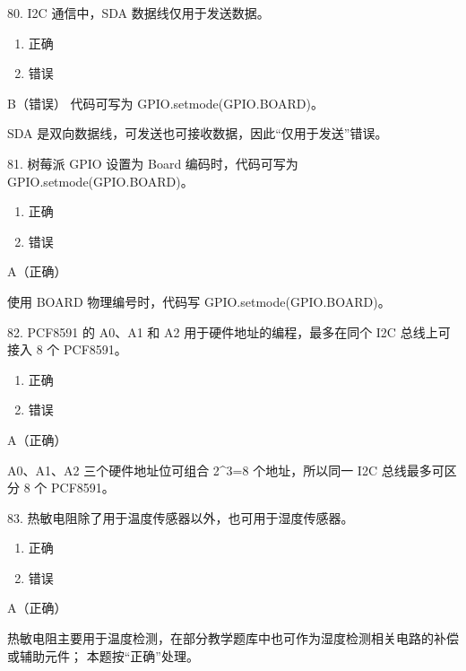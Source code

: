 \begin{question}{80. I2C 通信中，SDA 数据线仅用于发送数据。}
\begin{enumerate}[label=\Alph*., leftmargin=2.4em, itemsep=0.2em]
\item 正确
\item 错误
\end{enumerate}
\end{question}
\begin{answer}
B（错误） 代码可写为 GPIO.setmode(GPIO.BOARD)。
\end{answer}
\begin{explanation}
SDA 是双向数据线，可发送也可接收数据，因此“仅用于发送”错误。
\end{explanation}

\begin{question}{81. 树莓派 GPIO 设置为 Board 编码时，代码可写为 GPIO.setmode(GPIO.BOARD)。}
\begin{enumerate}[label=\Alph*., leftmargin=2.4em, itemsep=0.2em]
\item 正确
\item 错误
\end{enumerate}
\end{question}
\begin{answer}
A（正确）
\end{answer}
\begin{explanation}
使用 BOARD 物理编号时，代码写 GPIO.setmode(GPIO.BOARD)。
\end{explanation}

\begin{question}{82. PCF8591 的 A0、A1 和 A2 用于硬件地址的编程，最多在同个 I2C 总线上可接入 8 个 PCF8591。}
\begin{enumerate}[label=\Alph*., leftmargin=2.4em, itemsep=0.2em]
\item 正确
\item 错误
\end{enumerate}
\end{question}
\begin{answer}
A（正确）
\end{answer}
\begin{explanation}
A0、A1、A2 三个硬件地址位可组合 2^3=8 个地址，所以同一 I2C 总线最多可区分 8 个 PCF8591。
\end{explanation}

\begin{question}{83. 热敏电阻除了用于温度传感器以外，也可用于湿度传感器。}
\begin{enumerate}[label=\Alph*., leftmargin=2.4em, itemsep=0.2em]
\item 正确
\item 错误
\end{enumerate}
\end{question}
\begin{answer}
A（正确）
\end{answer}
\begin{explanation}
热敏电阻主要用于温度检测，在部分教学题库中也可作为湿度检测相关电路的补偿或辅助元件； 本题按“正确”处理。
\end{explanation}

